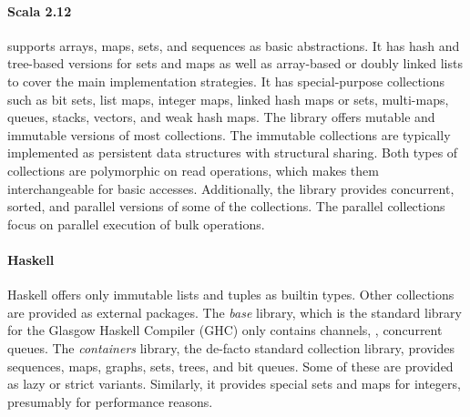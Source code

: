 \documentclass[sigconf, 10pt]{acmart}
\begin{document}
\paragraph{Scala 2.12}
\label{sec:scala-col}

supports arrays, maps, sets, and sequences as basic abstractions.
It has hash and tree-based versions for sets and maps
as well as array-based or doubly linked lists
to cover the main implementation strategies.
It has special-purpose collections
such as bit sets, list maps, integer maps, linked hash maps or sets, multi-maps,
queues, stacks, vectors, and weak hash maps.
The library offers mutable and immutable versions
of most collections.
The immutable collections are typically implemented
as persistent data structures with structural sharing.
Both types of collections are polymorphic on read operations,
which makes them interchangeable for basic accesses.
Additionally, the library provides concurrent, sorted,
and parallel versions of some of the collections.
The parallel collections focus on parallel execution of bulk operations.

%

\paragraph{Haskell}


Haskell offers only immutable lists and tuples as builtin types.
Other collections are provided as external packages.
The \emph{base} library,
which is the standard library for the Glasgow Haskell Compiler (GHC)
only contains channels, \ie, concurrent queues.
The \emph{containers} library, the de-facto standard collection library,
provides sequences, maps, graphs, sets, trees, and bit queues.
Some of these are provided as lazy or strict variants.
Similarly, it provides special sets and maps for integers,
presumably for performance reasons.
\end{document}
